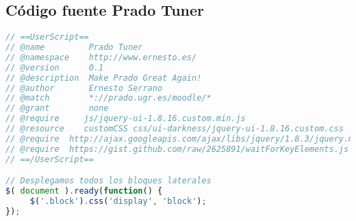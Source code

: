 \subsection{Código fuente Prado Tuner}
\begin{lstlisting}[language=javascript]	
// ==UserScript==
// @name         Prado Tuner 
// @namespace    http://www.ernesto.es/
// @version      0.1
// @description  Make Prado Great Again!
// @author       Ernesto Serrano
// @match        *://prado.ugr.es/moodle/*
// @grant        none
// @require     js/jquery-ui-1.8.16.custom.min.js
// @resource    customCSS css/ui-darkness/jquery-ui-1.8.16.custom.css
// @require  http://ajax.googleapis.com/ajax/libs/jquery/1.8.3/jquery.min.js
// @require  https://gist.github.com/raw/2625891/waitForKeyElements.js
// ==/UserScript==

// Desplegamos todos los bloques laterales
$( document ).ready(function() {
     $('.block').css('display', 'block');
});
\end{lstlisting}

\newpage
